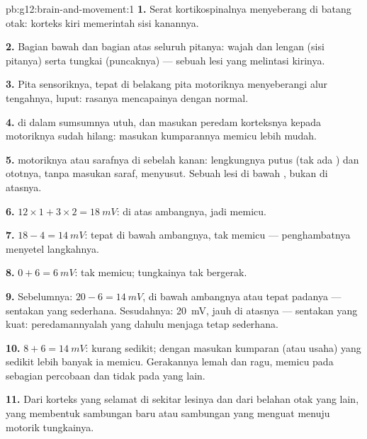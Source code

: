 \begin{solution}{pb:g12:brain-and-movement:1}
\textbf{1.} Serat kortikospinalnya menyeberang di batang otak: korteks
kiri memerintah sisi kanannya.

\textbf{2.} Bagian bawah dan bagian atas seluruh pitanya: wajah dan
lengan (sisi pitanya) serta tungkai (puncaknya) --- sebuah lesi yang
melintasi  kirinya.

\textbf{3.} Pita sensoriknya, tepat di belakang pita motoriknya
menyeberangi alur tengahnya, luput: rasanya mencapainya dengan normal.

\textbf{4.}  di dalam sumsumnya utuh, dan masukan
peredam korteksnya kepada  motoriknya sudah hilang: masukan
kumparannya memicu  lebih mudah.

\textbf{5.}  motoriknya atau sarafnya di sebelah kanan:
lengkungnya putus (tak ada ) dan ototnya, tanpa masukan saraf,
menyusut. Sebuah lesi di bawah , bukan di
atasnya.

\textbf{6.} $12 \times 1 + 3 \times 2 = \qty{18}{mV}$: di atas ambangnya,
jadi  memicu.

\textbf{7.} $18 - 4 = \qty{14}{mV}$: tepat di bawah ambangnya, tak
memicu --- penghambatnya menyetel langkahnya.

\textbf{8.} $0 + 6 = \qty{6}{mV}$: tak memicu; tungkainya tak bergerak.

\textbf{9.} Sebelumnya: $20 - 6 = \qty{14}{mV}$, di bawah ambangnya atau
tepat padanya --- sentakan yang sederhana. Sesudahnya: \qty{20}{mV},
jauh di atasnya --- sentakan yang kuat: peredamannyalah yang dahulu
menjaga  tetap sederhana.

\textbf{10.} $8 + 6 = \qty{14}{mV}$: kurang sedikit; dengan masukan
kumparan (atau usaha) yang sedikit lebih banyak ia memicu. Gerakannya
lemah dan ragu, memicu pada sebagian percobaan dan tidak pada yang lain.

\textbf{11.} Dari korteks yang selamat di sekitar lesinya dan dari
belahan otak yang lain, yang  membentuk sambungan baru atau
sambungan yang menguat menuju  motorik tungkainya.


\end{solution}

